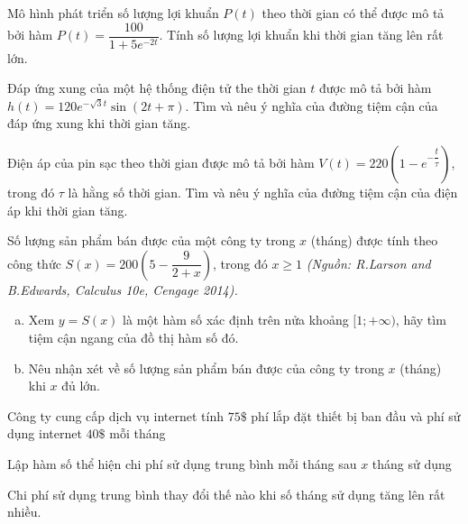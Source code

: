 \begin{ex}
    Mô hình phát triển số lượng lợi khuẩn $P(t)$ theo thời gian có thể được mô tả bởi hàm $P(t) = \dfrac{100}{1 + 5e^{-2t}}$. Tính số lượng lợi khuẩn khi thời gian tăng lên rất lớn.\\
\end{ex}
\begin{ex}
    Đáp ứng xung của một hệ thống điện tử the thời gian $t$ được mô tả bởi hàm \( h(t) = 120 e^{-\sqrt{3}t} \sin(2 t + \pi) \). Tìm và nêu ý nghĩa của đường tiệm cận của đáp ứng xung khi thời gian tăng.
\end{ex}
\begin{ex}
    Điện áp của pin sạc theo thời gian được mô tả bởi hàm \( V(t) = 220 \left(1 - e^{-\dfrac{t}{\tau}}\right) \), trong đó \( \tau \) là hằng số thời gian. Tìm và nêu ý nghĩa của đường tiệm cận của điện áp khi thời gian tăng.
\end{ex}
\begin{ex}%
    Số lượng sản phẩm bán được của một công ty trong $x$ (tháng) được tính theo công thức $S(x)=200\left(5-\dfrac{9}{2+x}\right)$, trong đó $x\ge 1$ \emph{(Nguồn: R.Larson and B.Edwards, Calculus 10e, Cengage 2014).}
    \begin{enumerate}[a)]
        \item Xem $y=S(x)$ là một hàm số xác định trên nửa khoảng $[1;+\infty)$, hãy tìm tiệm cận ngang của đồ thị hàm số đó.
        \item Nêu nhận xét về số lượng sản phẩm bán được của công ty trong $x$ (tháng) khi $x$ đủ lớn.
    \end{enumerate}
\end{ex}
\begin{ex}
    Công ty cung cấp dịch vụ internet tính $75\$$ phí lắp đặt thiết bị ban đầu và phí sử dụng internet $40\$$ mỗi tháng
    \begin{listEX}
        \item Lập hàm số thể hiện chi phí sử dụng trung bình mỗi tháng sau $x$ tháng sử dụng
        \item Chi phí sử dụng trung bình thay đổi thế nào khi số tháng sử dụng tăng lên rất nhiều.
    \end{listEX}
\end{ex}

